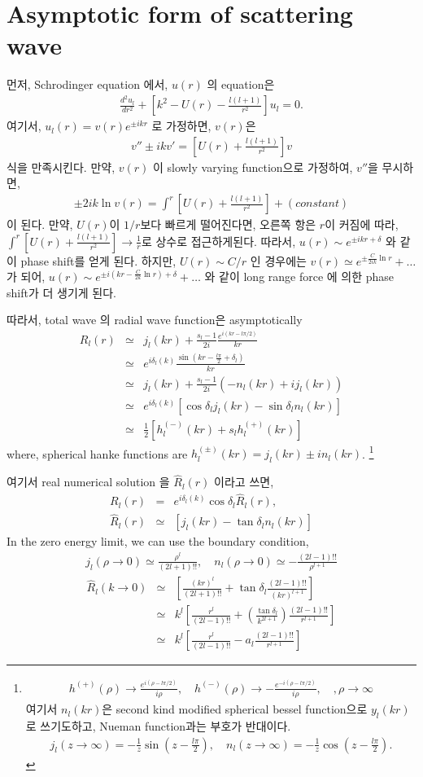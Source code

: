 \documentclass[10pt]{book}
\newcommand{\bea}{\begin{eqnarray}}
\newcommand{\eea}{\end{eqnarray}}
\newcommand{\no}{\nonumber \\}
\begin{document}
\section{Asymptotic form of scattering wave}
먼저, Schrodinger equation 에서, $u(r)$ 의 equation은
\bea
\frac{d^2 u_l}{dr^2}
+\left[k^2-U(r)-\frac{l(l+1)}{r^2}\right] u_l=0.
\eea
여기서, $u_l(r)=v(r) e^{\pm ikr}$ 로 가정하면, $v(r)$은 
\bea
v''\pm ik v'=\left[U(r)+\frac{l(l+1)}{r^2}\right]v
\eea
식을 만족시킨다. 만약, $v(r)$ 이 slowly varying function으로
가정하여, $v''$을 무시하면,
\bea
\pm 2ik \ln v(r)=\int^r \left[U(r)+\frac{l(l+1)}{r^2}\right]+(constant)
\eea
이 된다. 만약, $U(r)$이 $1/r$보다 빠르게 떨어진다면, 오른쪽 항은
$r$이 커짐에 따라, 
$\int^r \left[U(r)+\frac{l(l+1)}{r^2}\right]\to \frac{1}{r}$로
상수로 접근하게된다. 따라서, $u(r)\sim e^{\pm ikr+\delta}$
와 같이 phase shift를 얻게 된다. 
하지만, $U(r)\sim C/r$ 인 경우에는 
$v(r)\simeq e^{\pm \frac{C}{2ik} \ln r}+\dots$ 가 되어,
$u(r)\sim e^{\pm i(kr-\frac{C}{2k}\ln r)+\delta}+\dots$
와 같이 long range force 에 의한 phase shift가 더 생기게 된다.



따라서, total wave 의 radial wave function은 
asymptotically
\bea
R_{l}(r)&\simeq& 
j_l(kr)+\frac{s_l-1}{2i}\frac{e^{i(kr-l\pi/2)}}{kr}\no
&\simeq& e^{i\delta_l(k)}\frac{\sin(kr-\frac{l\pi}{2}+\delta_l)}{kr}\no
&\simeq& j_l(kr)+\frac{s_l-1}{2i}(-n_l(kr)+i j_l(kr)) \no
&\simeq& e^{i\delta_l(k)}[\cos\delta_l j_l(kr)-\sin\delta_l n_l(kr)] \no
&\simeq& \frac{1}{2}[h^{(-)}_l(kr)+s_l h^{(+)}_l(kr)]  
\eea
where, spherical hanke functions are 
$h^{(\pm)}_l(kr)=j_l(kr)\pm i n_{l}(kr)$.
\footnote{
\bea
h^{(+)}(\rho)\to \frac{e^{i(\rho-l\pi/2)}}{i\rho},
\quad h^{(-)}(\rho)\to -\frac{e^{-i(\rho-l\pi/2)}}{i\rho}, 
\quad , \rho\to \infty
\eea
여기서 $n_l(kr)$은 second kind modified spherical bessel function으로
$y_{l}(kr)$ 로 쓰기도하고, Nueman function과는 부호가 반대이다.
\bea
j_l(z\to \infty)=-\frac{1}{z}\sin(z-\frac{l\pi}{2}),\quad
n_l(z\to \infty)=-\frac{1}{z}\cos(z-\frac{l\pi}{2}).
\eea
}

여기서  real numerical solution 을 $\hat{R}_l(r)$ 이라고 
쓰면, 
\bea
R_l(r)&=&e^{i\delta_l(k)}\cos\delta_l \hat{R}_{l}(r),\no
\hat{R}_l(r)&\simeq& [j_l(kr)-\tan\delta_l n_l(kr)]
\eea
In the zero energy limit, we can use
the boundary condition, 
\bea
j_l(\rho\to 0)\simeq \frac{\rho^l}{(2l+1)!!},\quad
n_l(\rho\to 0)\simeq -\frac{(2l-1)!!}{\rho^{l+1}}
\eea 
\bea
\hat{R}_l(k\to 0)&\simeq& [\frac{(kr)^l}{(2l+1)!!}
                   +\tan\delta_l\frac{(2l-1)!!}{(kr)^{l+1}}]\no
            &\simeq&  k^l\left[ 
            \frac{r^l}{(2l-1)!!}+\left(\frac{\tan\delta_l}{k^{2l+1}}
            \right)\frac{(2l-1)!!}{r^{l+1}}
            \right]
            \no        
            &\simeq& 
            k^l\left[ \frac{r^l}{(2l-1)!!}-a_l \frac{(2l-1)!!}{r^{l+1}}
            \right]
\eea
\end{document}
